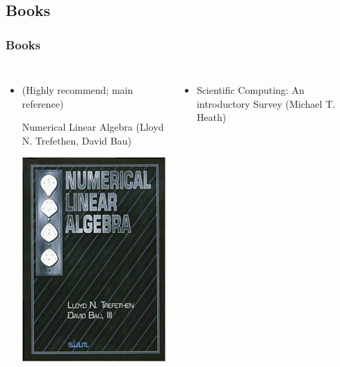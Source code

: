 \documentclass[10pt]{beamer}
\begin{document}
\subsection*{Books}
\begin{frame}
  \frametitle{Books}
  \begin{columns}
    \begin{itemize}
      \item <2-> (Highly recommend; main reference) 
      
            Numerical Linear Algebra (Lloyd N. Trefethen, David Bau)

            \includegraphics[height=0.5\textheight]{numerical-linear-algebra.jpg}
    \end{itemize}
    \begin{itemize}
      \item <3-> Scientific Computing: An introductory Survey (Michael T. Heath)
      

\end{itemize}
\end{columns}
\end{frame}
\end{document}
